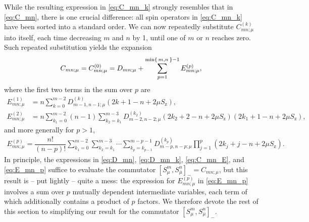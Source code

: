 \documentclass[aps,pra,twocolumn,longbibliography]{revtex4-2}
\newcommand{\f}[2]{\dfrac{#1}{#2}} %
\newcommand{\p}[1]{\left( #1 \right)} %
\renewcommand{\sp}[1]{\left[ #1 \right]} %
\newcommand{\z}{\text{z}}
\newcommand{\bmu}{{\bar\mu}}
\newcommand{\1}{\mathds{1}}
\begin{document}
While the resulting expression in \eqref{eq:C_mn_k} strongly resembles
that in \eqref{eq:C_mn}, there is one crucial difference: all spin
operators in \eqref{eq:C_mn_k} have been sorted into a standard order.
We can now repeatedly substitute $C_{mn;\mu}^{(k)}$ into itself, each
time decreasing $m$ and $n$ by 1, until one of $m$ or $n$ reaches
zero.  Such repeated substitution yields the expansion
\begin{align}
  C_{mn;\mu}
  = C_{mn;\mu}^{(0)}
  = D_{mn;\mu}
  + \sum_{p=1}^{\min\set{m,n}-1} E_{mn;\mu}^{(p)},
  \label{eq:C_mn_E}
\end{align}
where the first two terms in the sum over $p$ are
\begin{align}
  E_{mn;\mu}^{(1)}
  &= n \sum_{k=0}^{m-2} D_{m-1,n-1;\mu}^{(k)} \p{2k+1-n+2\mu S_\z}, \\
  E_{mn;\mu}^{(2)}
  &= n \sum_{k_1=0}^{m-2} \p{n-1} \sum_{k_2=k_1}^{m-3}
  D_{m-2,n-2;\mu}^{(k_2)} \p{2k_2+2-n+2\mu S_\z} \p{2k_1+1-n+2\mu S_\z},
\end{align}
and more generally for $p>1$,
\begin{align}
  E_{mn;\mu}^{(p)}
  = \f{n!}{\p{n-p}!}
  \sum_{k_1=0}^{m-2} \sum_{k_2=k_1}^{m-3} \cdots\sum_{k_p=k_{p-1}}^{m-p-1}
  D_{m-p,n-p;\mu}^{(k_p)} \prod_{j=1}^p \p{2k_j+j-n+2\mu S_\z}.
  \label{eq:E_mn_p}
\end{align}
In principle, the expressions in \eqref{eq:D_mn}, \eqref{eq:D_mn_k},
\eqref{eq:C_mn_E}, and \eqref{eq:E_mn_p} suffice to evaluate the
commutator $\sp{S_\mu^m,S_\bmu^n}_- = C_{mn;\mu}$, but this result is
-- put lightly -- quite a mess: the expression for $E_{mn;\mu}^{(p)}$
in \eqref{eq:E_mn_p} involves a sum over $p$ mutually dependent
intermediate variables, each term of which additionally contains a
product of $p$ factors.  We therefore devote the rest of this section
to simplifying our result for the commutator
$\sp{S_\mu^m,S_\bmu^n}_-$.
\end{document}

